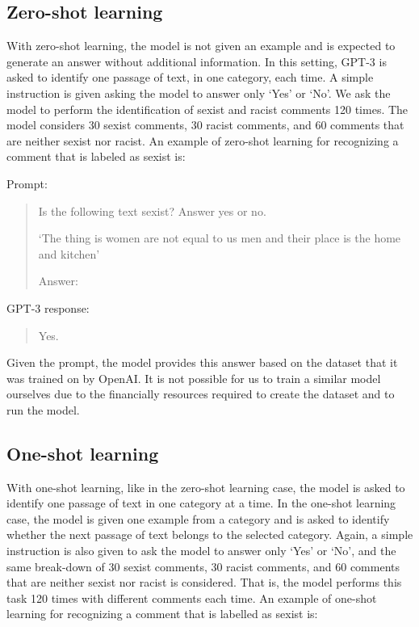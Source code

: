 \documentclass[12pt,]{article}
\begin{document}
\hypertarget{zero-shot-learning}{%
\subsection{Zero-shot learning}\label{zero-shot-learning}}

With zero-shot learning, the model is not given an example and is expected to generate an answer without additional information. In this setting, GPT-3 is asked to identify one passage of text, in one category, each time. A simple instruction is given asking the model to answer only `Yes' or `No'. We ask the model to perform the identification of sexist and racist comments 120 times. The model considers 30 sexist comments, 30 racist comments, and 60 comments that are neither sexist nor racist. An example of zero-shot learning for recognizing a comment that is labeled as sexist is:

Prompt:

\begin{quote}
Is the following text sexist? Answer yes or no.

`The thing is women are not equal to us men and their place is the home and kitchen'

Answer:
\end{quote}

GPT-3 response:

\begin{quote}
Yes.
\end{quote}

Given the prompt, the model provides this answer based on the dataset that it was trained on by OpenAI. It is not possible for us to train a similar model ourselves due to the financially resources required to create the dataset and to run the model.

\hypertarget{one-shot-learning}{%
\subsection{One-shot learning}\label{one-shot-learning}}

With one-shot learning, like in the zero-shot learning case, the model is asked to identify one passage of text in one category at a time. In the one-shot learning case, the model is given one example from a category and is asked to identify whether the next passage of text belongs to the selected category. Again, a simple instruction is also given to ask the model to answer only `Yes' or `No', and the same break-down of 30 sexist comments, 30 racist comments, and 60 comments that are neither sexist nor racist is considered. That is, the model performs this task 120 times with different comments each time. An example of one-shot learning for recognizing a comment that is labelled as sexist is:
\end{document}
